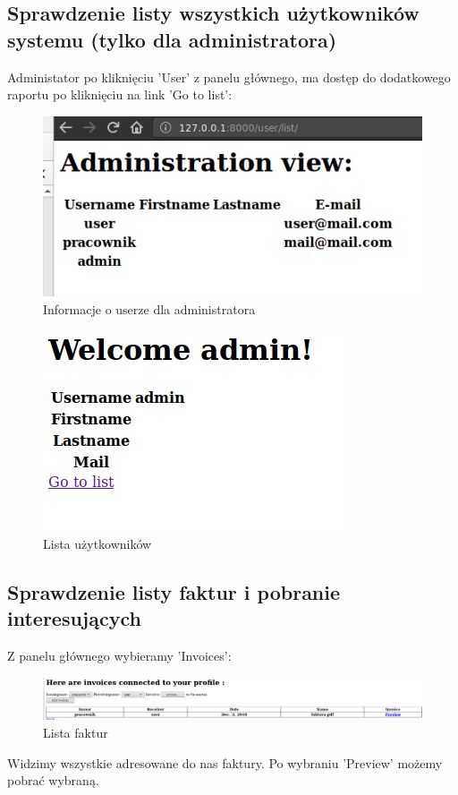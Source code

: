 \documentclass[12pt]{article}
\begin{document}
\subsection{Sprawdzenie listy wszystkich użytkowników systemu (tylko dla administratora)}
Administator po kliknięciu 'User' z panelu głównego, ma dostęp do dodatkowego raportu po kliknięciu na link 'Go to list':
\begin{figure}[H]
	\centering
	\includegraphics[scale=0.7]{img/16.png}
	\caption{Informacje o userze dla administratora}
\end{figure}
\begin{figure}[H]
	\centering
	\includegraphics[scale=0.7]{img/15.png}
	\caption{Lista użytkowników}
\end{figure}
\subsection{Sprawdzenie listy faktur i pobranie interesujących}
Z panelu głównego wybieramy 'Invoices':
\begin{figure}[H]
	\centering
	\includegraphics[scale=0.3]{img/8.png}
	\caption{Lista faktur}
\end{figure}
Widzimy wszystkie adresowane do nas faktury. Po wybraniu 'Preview' możemy pobrać wybraną.
\end{document}
